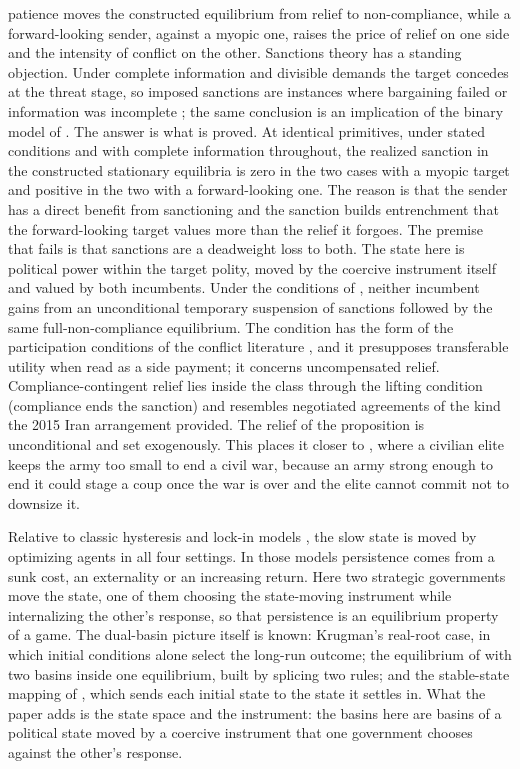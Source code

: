 patience moves the constructed equilibrium from relief to non-compliance, while a
forward-looking sender, against a myopic one, raises the price of relief on one
side and the intensity of conflict on the other. Sanctions theory has a standing
objection. Under complete information
and divisible demands the target concedes at the threat stage, so imposed
sanctions are instances where bargaining failed or information was
incomplete \citep{Drezner2003}; the same conclusion is an implication of the
binary model of \citet{Eaton1992}. The answer is what is proved. At
identical primitives, under stated conditions and with complete information
throughout, the realized
sanction in the constructed stationary equilibria is zero in the two cases with
a myopic target and positive in the two with a forward-looking one. The reason
is that the sender has a direct benefit
from sanctioning and the sanction builds entrenchment that the
forward-looking target values more than the relief it forgoes. The premise
that fails is that sanctions are a deadweight loss to both. The state here
is political power within the target polity, moved by the coercive instrument
itself and valued by both incumbents. Under the
conditions of , neither incumbent gains from an unconditional temporary suspension of sanctions followed by
the same full-non-compliance equilibrium. The condition has
the form of the participation conditions of the conflict literature
\citep{GarfinkelSkaperdas2000,McBrideSkaperdas2009}, and it presupposes
transferable utility when read as a side payment; it concerns uncompensated
relief. Compliance-contingent relief lies inside the
class through the lifting condition (compliance ends the sanction) and resembles
negotiated agreements of the kind the 2015 Iran arrangement provided.
The relief of the proposition is unconditional and set exogenously. This places it closer to
\citet{AcemogluTicchiVindigni2010}, where a civilian elite keeps the army too
small to end a civil war, because an army strong enough to end it could stage a
coup once the war is over and the elite cannot commit not to downsize it.

Relative to classic hysteresis and lock-in models
\citep{Dixit1989,Krugman1991,Arthur1989}, the slow state is moved by optimizing
agents in all four settings. In those models persistence comes from a sunk
cost, an externality or an increasing return. Here two strategic
governments move the state, one of them choosing the state-moving instrument while
internalizing the other's response, so that persistence is an equilibrium
property of a game. The dual-basin picture itself is known: Krugman's real-root case, in
which initial conditions alone select the long-run outcome; the equilibrium
of \citet{HasslerEtAl2003} with two basins inside one equilibrium, built by
splicing two rules; and the stable-state mapping of
\citet{AcemogluEgorovSonin2012}, which sends each initial state to the state
it settles in. What the paper adds is the state space and the
instrument: the basins here are basins of a political state moved by a
coercive instrument that one government chooses against the other's response.

